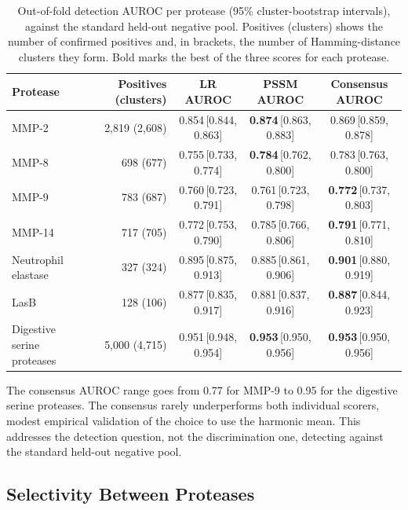 \documentclass[10pt,a4paper]{article}
\numberwithin{equation}{section}
\begin{document}
\begin{table}[H]
\centering
\footnotesize\renewcommand{\arraystretch}{1.25}
\begin{tabular}{@{}lrccc@{}}
\toprule
Protease & Positives (clusters) & LR AUROC & PSSM AUROC & Consensus AUROC \\
\midrule
MMP-2 & 2,819 (2,608) & 0.854\,[0.844, 0.863] & \textbf{0.874}\,[0.863, 0.883] & 0.869\,[0.859, 0.878] \\
MMP-8 & 698 (677) & 0.755\,[0.733, 0.774] & \textbf{0.784}\,[0.762, 0.800] & 0.783\,[0.763, 0.800] \\
MMP-9 & 783 (687) & 0.760\,[0.723, 0.791] & 0.761\,[0.723, 0.798] & \textbf{0.772}\,[0.737, 0.803] \\
MMP-14 & 717 (705) & 0.772\,[0.753, 0.790] & 0.785\,[0.766, 0.806] & \textbf{0.791}\,[0.771, 0.810] \\
Neutrophil elastase & 327 (324) & 0.895\,[0.875, 0.913] & 0.885\,[0.861, 0.906] & \textbf{0.901}\,[0.880, 0.919] \\
LasB & 128 (106) & 0.877\,[0.835, 0.917] & 0.881\,[0.837, 0.916] & \textbf{0.887}\,[0.844, 0.923] \\
Digestive serine proteases & 5,000 (4,715) & 0.951\,[0.948, 0.954] & \textbf{0.953}\,[0.950, 0.956] & \textbf{0.953}\,[0.950, 0.956] \\
\bottomrule
\end{tabular}
\caption{Out-of-fold detection AUROC per protease (95\% cluster-bootstrap intervals), against the standard held-out negative pool. Positives (clusters) shows the number of confirmed positives and, in brackets, the number of Hamming-distance clusters they form. Bold marks the best of the three scores for each protease.}
\label{tab:detection}
\end{table}

The consensus AUROC range goes from 0.77 for MMP-9 to 0.95 for the digestive serine proteases. The consensus rarely underperforms both individual scorers, modest empirical validation of the choice to use the harmonic mean. This addresses the detection question, not the discrimination one, detecting against the standard held-out negative pool.

\subsection{Selectivity Between Proteases}
\end{document}
